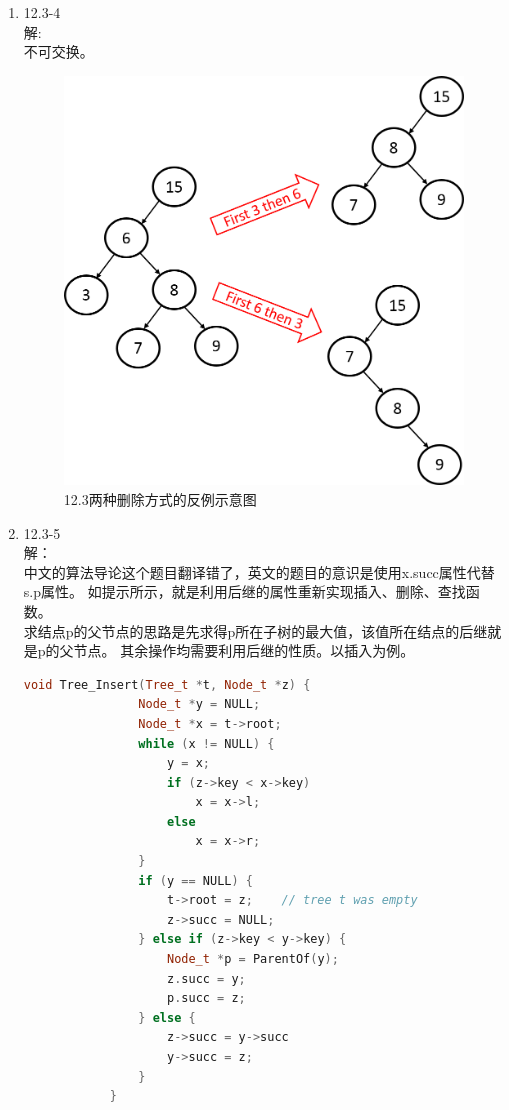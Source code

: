\documentclass[UTF8]{ctexart}
\begin{document}
\begin{enumerate}
	\item 12.3-4 \\
	解: \\
		不可交换。\\
		\begin{figure}[H]
		\centering
        \caption{12.3两种删除方式的反例示意图}
		\includegraphics[scale=0.65]{1203_4.png}
		\end{figure}
	
	\item 12.3-5 \\
	解：\\
		中文的算法导论这个题目翻译错了，英文的题目的意识是使用x.succ属性代替s.p属性。
		如提示所示，就是利用后继的属性重新实现插入、删除、查找函数。\\
		求结点p的父节点的思路是先求得p所在子树的最大值，该值所在结点的后继就是p的父节点。
		其余操作均需要利用后继的性质。以插入为例。\\
		\begin{lstlisting}[language=C++]
			void Tree_Insert(Tree_t *t, Node_t *z) {
				Node_t *y = NULL;
				Node_t *x = t->root;
				while (x != NULL) {
					y = x;
					if (z->key < x->key)
						x = x->l;
					else
						x = x->r;
				}
				if (y == NULL) {
					t->root = z;	// tree t was empty
					z->succ = NULL;
				} else if (z->key < y->key) {
					Node_t *p = ParentOf(y);
					z.succ = y;
					p.succ = z;
				} else {
					z->succ = y->succ
					y->succ = z;
				}
			}
        \end{lstlisting}
		
\end{enumerate}
\end{document}
